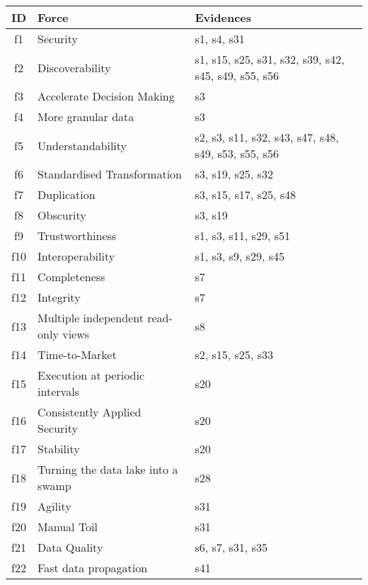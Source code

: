 \begin{tabular}{|c|p{}|p{}|}
\hline
{\bf ID} & {\bf Force} & {\bf Evidences}\\
\hline
f1 & Security & \cellcolor{emerald_shape_2} {s1, s4, s31}\\
f2 & Discoverability & \cellcolor{emerald_shape_4} {s1, s15, s25, s31, s32, s39, s42, s45, s49, s55, s56}\\
f3 & Accelerate Decision Making & \cellcolor{emerald_shape_1} {s3}\\
f4 & More granular data & \cellcolor{emerald_shape_1} {s3}\\
f5 & Understandability & \cellcolor{emerald_shape_4} {s2, s3, s11, s32, s43, s47, s48, s49, s53, s55, s56}\\
f6 & Standardised Transformation & \cellcolor{emerald_shape_2} {s3, s19, s25, s32}\\
f7 & Duplication & \cellcolor{emerald_shape_3} {s3, s15, s17, s25, s48}\\
f8 & Obscurity & \cellcolor{emerald_shape_1} {s3, s19}\\
f9 & Trustworthiness & \cellcolor{emerald_shape_3} {s1, s3, s11, s29, s51}\\
f10 & Interoperability & \cellcolor{emerald_shape_3} {s1, s3, s9, s29, s45}\\
f11 & Completeness & \cellcolor{emerald_shape_1} {s7}\\
f12 & Integrity & \cellcolor{emerald_shape_1} {s7}\\
f13 & Multiple independent read-only views & \cellcolor{emerald_shape_1} {s8}\\
f14 & Time-to-Market & \cellcolor{emerald_shape_2} {s2, s15, s25, s33}\\
f15 & Execution at periodic intervals & \cellcolor{emerald_shape_1} {s20}\\
f16 & Consistently Applied Security & \cellcolor{emerald_shape_1} {s20}\\
f17 & Stability & \cellcolor{emerald_shape_1} {s20}\\
f18 & Turning the data lake into a swamp & \cellcolor{emerald_shape_1} {s28}\\
f19 & Agility & \cellcolor{emerald_shape_1} {s31}\\
f20 & Manual Toil & \cellcolor{emerald_shape_1} {s31}\\
f21 & Data Quality & \cellcolor{emerald_shape_2} {s6, s7, s31, s35}\\
f22 & Fast data propagation & \cellcolor{emerald_shape_1} {s41}\\

\end{tabular}
